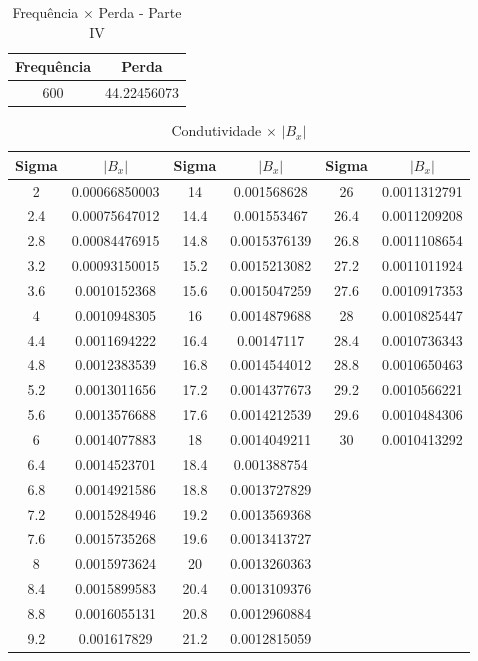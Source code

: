 \documentclass[
	12pt,				%
	openright,			%
	twoside,			%
	a4paper,			%
	english,			%
	french,				%
	spanish,			%
	brazil,				%
	]{abntex2}
\begin{document}
\begin{apendicesenv}
\newpage
\begin{table}[H]
\caption{Frequência  $\times$ Perda - Parte IV \label{tab:p_f_vi}}
\centering
\begin{tabular}{c c}
Frequência & Perda \\
\hline
600 & 44.22456073

\end{tabular}
\end{table}

\newpage
\begin{table}[H]
\caption{Condutividade  $\times$  $|B_{x}|$}
\centering
\begin{tabular}{c c| c c | c c}
Sigma & $|B_{x}|$ & Sigma & $|B_{x}|$ & Sigma & $|B_{x}|$ \\
\hline
2 & 0.00066850003 & 14 & 0.001568628 & 26 & 0.0011312791\\
2.4 & 0.00075647012 & 14.4 & 0.001553467 & 26.4 & 0.0011209208\\
2.8 & 0.00084476915 & 14.8 & 0.0015376139 & 26.8 & 0.0011108654\\
3.2 & 0.00093150015 & 15.2 & 0.0015213082 & 27.2 & 0.0011011924\\
3.6 & 0.0010152368 & 15.6 & 0.0015047259 & 27.6 & 0.0010917353\\
4 & 0.0010948305 & 16 & 0.0014879688 & 28 & 0.0010825447\\
4.4 & 0.0011694222 & 16.4 & 0.00147117 & 28.4 & 0.0010736343\\
4.8 & 0.0012383539 & 16.8 & 0.0014544012 & 28.8 & 0.0010650463\\
5.2 & 0.0013011656 & 17.2 & 0.0014377673 & 29.2 & 0.0010566221\\
5.6 & 0.0013576688 & 17.6 & 0.0014212539 & 29.6 & 0.0010484306\\
6 & 0.0014077883 & 18 & 0.0014049211 & 30 & 0.0010413292\\
6.4 & 0.0014523701 & 18.4 & 0.001388754 \\
6.8 & 0.0014921586 & 18.8 & 0.0013727829 \\
7.2 & 0.0015284946 & 19.2 & 0.0013569368 \\
7.6 & 0.0015735268 & 19.6 & 0.0013413727 \\
8 & 0.0015973624 & 20 & 0.0013260363\\
8.4 & 0.0015899583 & 20.4 & 0.0013109376 \\
8.8 & 0.0016055131 & 20.8 & 0.0012960884 \\
9.2 & 0.001617829 & 21.2 & 0.0012815059 \\

\end{tabular}
\end{table}
\end{apendicesenv}
\end{document}
